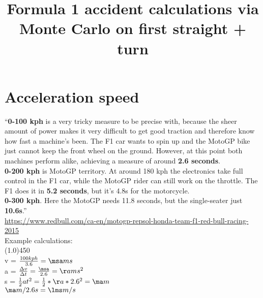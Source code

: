 \documentclass{article}
\begin{document}
\title{Formula 1 accident calculations via Monte Carlo on first straight + turn}
\maketitle

\section{Acceleration speed}

``\textbf{0-100 kph} is a very tricky measure to be precise with, because the sheer amount of power makes it very difficult to get good traction and therefore know how fast a machine's been. The F1 car wants to spin up and the MotoGP bike just cannot keep the front wheel on the ground. However, at this point both machines perform alike, achieving a measure of around \textbf{2.6 seconds}. \\

\noindent
\textbf{0-200 kph} is MotoGP territory. At around 180 kph the electronics take full control in the F1 car, while the MotoGP rider can still work on the throttle. The F1 does it in \textbf{5.2 seconds}, but it's 4.8s for the motorcycle. \\

\noindent
\textbf{0-300 kph}. Here the MotoGP needs 11.8 seconds, but the single-seater just \textbf{10.6s}.''\\
\url{https://www.redbull.com/ca-en/motogp-repsol-honda-team-f1-red-bull-racing-2015} \\

Example calculations: \\
\line(1.0){450} \\

v = $\frac{100kph}{3.6}=\msa ms$\\

\def\time{2.6}
\DIVIDE{\msa}{\time}{\aa}
a = $\frac{\Delta v}{\Delta t} = \frac{\msa}{\time} = \aa ms^2$\\

\SQUARE{\time}{\square}
\MULTIPLY{\aa}{\square}{\tmp}
s = $\frac{1}{2} at^2 = \frac{1}{2} * \aa * \time^2 = \ma m $\\

\DIVIDE{\ma}{\time}{\lms}
$\ma m / \time s = \lms m/s$\\
\end{document}
